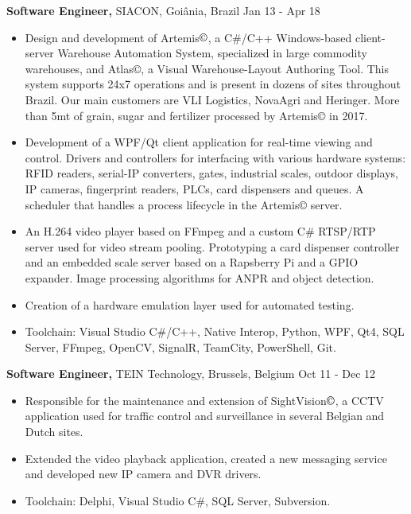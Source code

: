 \documentclass[margin]{res}
\begin{document}
\begin{resume}
 {\bf Software Engineer,} SIACON, Goiânia, Brazil \hfill Jan 13 - Apr 18
 \begin{itemize} \itemsep -2pt  %
 \item Design and development of Artemis$\copyright$, a C\#/C++ Windows-based client-server Warehouse Automation System, specialized in large commodity warehouses, and Atlas©, a Visual Warehouse-Layout Authoring Tool. This system supports 24x7 operations and is present in dozens of sites throughout Brazil. Our main customers are VLI Logistics, NovaAgri and Heringer. More than 5mt of grain, sugar and fertilizer processed by Artemis© in 2017.
 \item Development of a WPF/Qt client application for real-time viewing and control. Drivers and controllers for interfacing with various hardware systems: RFID readers, serial-IP converters, gates, industrial scales, outdoor displays, IP cameras, fingerprint readers, PLCs, card dispensers and queues. A scheduler that handles a process lifecycle in the Artemis© server.
 \item An H.264 video player based on FFmpeg and a custom C\# RTSP/RTP server used for video stream pooling. Prototyping a card dispenser controller and an embedded scale server based on a Rapsberry Pi and a GPIO expander. Image processing algorithms for ANPR and object detection.
 \item Creation of a hardware emulation layer used for automated testing.
 \item Toolchain: Visual Studio C\#/C++, Native Interop, Python, WPF, Qt4, SQL Server, FFmpeg, OpenCV, SignalR, TeamCity, PowerShell, Git.
\end{itemize}

 {\bf Software Engineer,} TEIN Technology, Brussels, Belgium \hfill Oct 11 - Dec 12
 \begin{itemize} \itemsep -2pt  %
 \item Responsible for the maintenance and extension of SightVision$\copyright$, a CCTV application used for traffic control and surveillance in several Belgian and Dutch sites.
 \item Extended the video playback application, created a new messaging service and developed new IP camera and DVR drivers.
 \item Toolchain: Delphi, Visual Studio C\#, SQL Server, Subversion.
 \end{itemize}


\end{resume}
\end{document}
